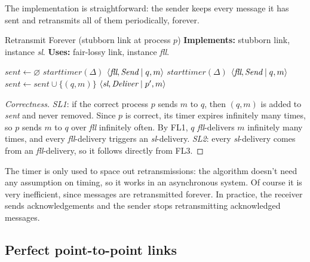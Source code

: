 The implementation is straightforward: the sender keeps every message it has sent and retransmits all of them periodically, forever.

\begin{framedalgo}[label={alg:retransmit}, unbreakable]{Retransmit Forever (stubborn link at process $p$)}
  \textbf{Implements:} stubborn link, instance \textit{sl}. \quad \textbf{Uses:} fair-lossy link, instance \textit{fll}.
  \begin{algorithmic}[1]
      \State $\textit{sent} \gets \varnothing$
      \State $\textit{starttimer}(\Delta)$
    \EndUpon
        \State \Trigger $\left\langle \textit{fll}, \textit{Send} \mid q, m \right\rangle$
      \EndFor
      \State $\textit{starttimer}(\Delta)$
    \EndUpon
      \State \Trigger $\left\langle \textit{fll}, \textit{Send} \mid q, m \right\rangle$
      \State $\textit{sent} \gets \textit{sent} \cup \{(q, m)\}$
    \EndUpon
      \State \Trigger $\left\langle \textit{sl}, \textit{Deliver} \mid p', m \right\rangle$
    \EndUpon
  \end{algorithmic}
\end{framedalgo}

\begin{proof}[Correctness]
  \textit{SL1}: if the correct process $p$ sends $m$ to $q$, then $(q,m)$ is added to \textit{sent} and never removed. Since $p$ is correct, its timer expires infinitely many times, so $p$ sends $m$ to $q$ over \textit{fll} infinitely often. By FL1, $q$ \textit{fll}-delivers $m$ infinitely many times, and every \textit{fll}-delivery triggers an \textit{sl}-delivery. \textit{SL2}: every \textit{sl}-delivery comes from an \textit{fll}-delivery, so it follows directly from FL3.
\end{proof}

\begin{framedobs}{}
  The timer is only used to space out retransmissions: the algorithm doesn't need any assumption on timing, so it works in an asynchronous system. Of course it is very inefficient, since messages are retransmitted forever. In practice, the receiver sends acknowledgements and the sender stops retransmitting acknowledged messages.
\end{framedobs}

\subsection{Perfect point-to-point links}

